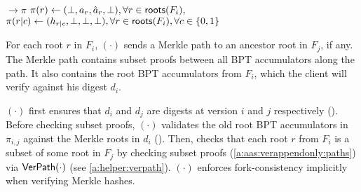 \begin{algorithm}[H]
\begin{algorithmic}[1]
     $\rightarrow \pi$
        \State $\pi(r)\gets (\bot,\textcolor{black}{a}_{r}, \textcolor{black}{\hat{a}}_{r}, \bot), \forall r\in\mathsf{roots}(F_i),$
        \State $\pi(r|c)\gets (\textcolor{black}{h}_{r|c},\bot,\bot,\bot), \forall r\in\mathsf{roots}(F_i), \forall c\in \{0,1\}$
    \EndFunction
    \end{algorithmic}
\end{algorithm}

For each root $r$ in $F_i$, {\proveappendonly}$(\cdot)$ sends a Merkle path to an ancestor root in $F_j$, if any.
The Merkle path contains subset proofs between all BPT accumulators along the path.
It also contains the root BPT accumulators from $F_i$, which the client will verify against his digest $d_i$.

{\verappendonly}$(\cdot)$ first ensures that $d_i$ and $d_j$ are digests at version $i$ and $j$ respectively ().
Before checking subset proofs, {\verappendonly}$(\cdot)$ validates the old root BPT accumulators in $\pi_{i,j}$ against the Merkle roots in $d_i$ ().
Then, checks that each root $r$ from $F_i$ is a subset of some root in $F_j$ by checking subset proofs (\cref{a:aas:verappendonly:paths}) via $\mathsf{VerPath}(\cdot)$ (see \cref{a:helper:verpath}).
{\verappendonly}$(\cdot)$ enforces fork-consistency implicitly when verifying Merkle hashes.

